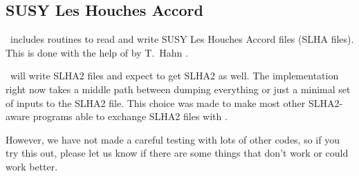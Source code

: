 
\subsection{SUSY Les Houches Accord}

\ds\ includes routines to read and write SUSY Les Houches Accord 
\cite{Skands:2003cj,Allanach:2008qq} files (SLHA
files). This is done with the help of  by T.~Hahn \cite{Hahn:2006nq}.

\ds\ will write SLHA2 files and expect to get SLHA2 as well. The implementation
right now takes a middle path between dumping everything or just
a minimal set of inputs to the SLHA2 file. This choice was made to make most
other SLHA2-aware programs able to exchange SLHA2 files with \ds.

However, we have not made a careful testing with lots of other codes, so
if you try this out, please let us know if there are some things that don't
work or could work better.


